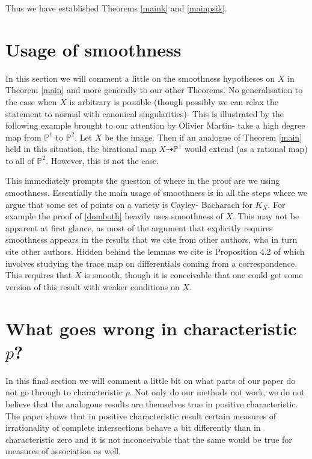 \documentclass[12pt]{amsart}
\numberwithin{equation}{section}
\numberwithin{theorem}{section}
\theoremstyle{definition}
\theoremstyle{definition}
\def\PP{{\mathbb{P}}}
\def\dra{{\dashrightarrow}}
\begin{document}
Thus we have established Theorems \ref{maink} and \ref{mainpsik}.
\section{Usage of smoothness}
In this section we will comment a little on the smoothness hypotheses on $X$ in Theorem \ref{main} and more generally to our other Theorems.  No generalisation to the case when $X$ is arbitrary is possible (though possibly we can relax the statement to normal with canonical singularities)- This is illustrated by the following example brought to our attention by Olivier Martin- take a high degree map from $\PP^1$ to $\PP^2$. Let $X$ be the image. Then if an analogue of Theorem \ref{main} held in this situation, the birational map $X \dra \PP^1$ would extend (as a rational map) to  all of $\PP^2$. However, this is not the case.


    
         
        This immediately prompts the question of where in the proof are we using smoothness. Essentially the main usage of smoothness is in all the steps where we argue that some set of points on a variety is Cayley- Bacharach for $K_X.$ For example the proof of \ref{domboth} heavily uses smoothness of $X$. This may not be apparent at first glance, as most of the argument that explicitly requires smoothness appears in the results that we cite from other authors, who in turn cite other authors.
         Hidden behind the lemmas we cite is Proposition 4.2 of \cite{Bast} which involves studying the trace map on  differentials coming from a correspondence. This requires that $X$ is smooth, though it is conceivable that one could get some version of this result with weaker conditions on $X$.
         
         
\section{What goes wrong in characteristic $p$?}
In this final section we will comment a little bit on what parts of our paper do not go through to characteristic $p$. Not only do our methods not work, we do not believe that the analogous results are themselves true in positive characteristic. The paper  \cite{S} shows that in positive characteristic result certain measures of irrationality of complete intersections behave a bit differently than in characteristic zero and it is not inconceivable that the same would be true for measures of association as well.
\end{document}
